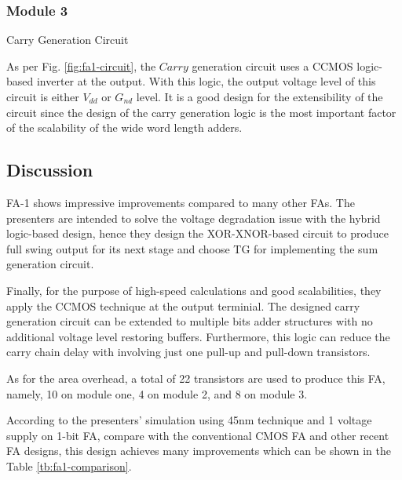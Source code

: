 \documentclass[conference]{IEEEtran}
\begin{document}
\subsubsection{Module 3}Carry Generation Circuit

As per Fig. \ref{fig:fa1-circuit}, the \(Carry\) generation circuit uses a CCMOS logic-based inverter at the output.
With this logic, the output voltage level of this circuit is either \(V_{dd}\) or \(G_{nd}\) level.
It is a good design for the extensibility of the circuit
since the design of the carry generation logic is the most important factor of the scalability of the wide word length adders.


\subsection{Discussion}

FA-1 shows impressive improvements compared to many other FAs.
The presenters are intended to solve the voltage degradation issue with the hybrid logic-based design,
hence they design the XOR-XNOR-based circuit to produce full swing output for its next stage
and choose TG for implementing the sum generation circuit.

Finally, for the purpose of high-speed calculations and good scalabilities,
they apply the CCMOS technique at the output terminial.
The designed carry generation circuit can be extended to multiple bits adder structures with no additional voltage level restoring buffers.
Furthermore, this logic can reduce the carry chain delay with involving just one pull-up and pull-down transistors.

As for the area overhead, a total of 22 transistors are used to produce this FA, namely, 10 on module one, 4 on module 2, and 8 on module 3.

According to the presenters' simulation using 45nm technique and 1 voltage supply on 1-bit FA,
compare with the conventional CMOS FA\cite{weste2015cmos} and other recent FA designs\cite{9068497,18743001},
this design achieves many improvements which can be shown in the Table \ref{tb:fa1-comparison}.
\end{document}

